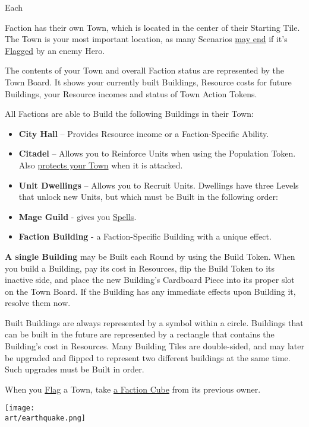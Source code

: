 
\begin{multicols*}{2}

\hypertarget{Town}{Each} Faction has their own Town, which is located in the center of their Starting Tile.
The Town is your most important location, as many Scenarios \hyperlink{End}{may end} if it's \hyperlink{Categories}{Flagged} by an enemy Hero.\par
The contents of your Town and overall Faction status are represented by the Town Board.
It shows your currently built Buildings, Resource costs for future Buildings, your Resource incomes and status of Town Action Tokens.\par
All Factions are able to Build the following Buildings in their Town:
\begin{itemize}
  \item \textbf{City Hall} – Provides Resource income or a Faction-Specific Ability.
  \item \textbf{Citadel} – Allows you to Reinforce Units when using the Population Token.
Also \hyperlink{Walls}{protects your Town} when it is attacked.
  \item \textbf{Unit Dwellings} – Allows you to Recruit Units.
Dwellings have three Levels that unlock new Units, but which must be Built in the following order:
  \item \textbf{Mage Guild} - gives you \hyperlink{spells}{Spells}.
  \item \textbf{Faction Building} - a Faction-Specific Building with a unique effect.
\end{itemize}
\textbf{A single Building} may be Built each Round by using the Build Token.
When you build a Building, pay its cost in Resources, flip the Build Token to its inactive side, and place the new Building’s Cardboard Piece into its proper slot on the Town Board.
If the Building has any immediate effects upon Building it, resolve them now.\par
Built Buildings are always represented by a symbol within a circle.
Buildings that can be built in the future are represented by a rectangle that contains the Building's cost in Resources.
Many Building Tiles are double-sided, and may later be upgraded and flipped to represent two different buildings at the same time. Such upgrades must be Built in order.\par
When you \hyperlink{Categories}{Flag} a Town, take \hyperlink{End}{a Faction Cube} from its previous owner.

\vspace*{\fill}

\begin{center}
  \texttt{[image: \\art/earthquake.png]}
\end{center}

\vspace*{\fill}

\end{multicols*}
